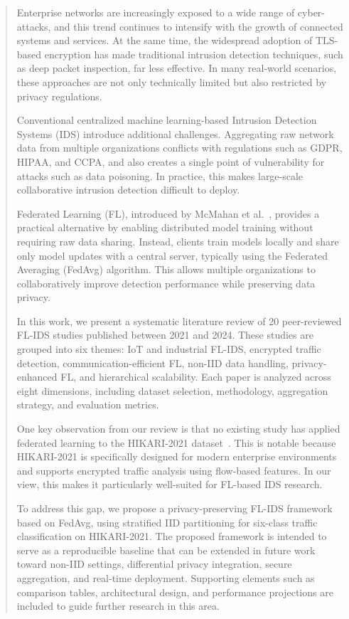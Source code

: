 \documentclass[conference]{IEEEtran}
\begin{document}
\begin{abstract}
Enterprise networks are increasingly exposed to a wide range of cyber-attacks, and this trend continues to intensify with the growth of connected systems and services. At the same time, the widespread adoption of TLS-based encryption has made traditional intrusion detection techniques, such as deep packet inspection, far less effective. In many real-world scenarios, these approaches are not only technically limited but also restricted by privacy regulations.

Conventional centralized machine learning-based Intrusion Detection Systems (IDS) introduce additional challenges. Aggregating raw network data from multiple organizations conflicts with regulations such as GDPR, HIPAA, and CCPA, and also creates a single point of vulnerability for attacks such as data poisoning. In practice, this makes large-scale collaborative intrusion detection difficult to deploy.

Federated Learning (FL), introduced by McMahan et al.~\cite{mcmahan2017}, provides a practical alternative by enabling distributed model training without requiring raw data sharing. Instead, clients train models locally and share only model updates with a central server, typically using the Federated Averaging (FedAvg) algorithm. This allows multiple organizations to collaboratively improve detection performance while preserving data privacy.

In this work, we present a systematic literature review of 20 peer-reviewed FL-IDS studies published between 2021 and 2024. These studies are grouped into six themes: IoT and industrial FL-IDS, encrypted traffic detection, communication-efficient FL, non-IID data handling, privacy-enhanced FL, and hierarchical scalability. Each paper is analyzed across eight dimensions, including dataset selection, methodology, aggregation strategy, and evaluation metrics.

One key observation from our review is that no existing study has applied federated learning to the HIKARI-2021 dataset~\cite{ferriyan2021}. This is notable because HIKARI-2021 is specifically designed for modern enterprise environments and supports encrypted traffic analysis using flow-based features. In our view, this makes it particularly well-suited for FL-based IDS research.

To address this gap, we propose a privacy-preserving FL-IDS framework based on FedAvg, using stratified IID partitioning for six-class traffic classification on HIKARI-2021. The proposed framework is intended to serve as a reproducible baseline that can be extended in future work toward non-IID settings, differential privacy integration, secure aggregation, and real-time deployment. Supporting elements such as comparison tables, architectural design, and performance projections are included to guide further research in this area.
\end{abstract}
\end{document}

